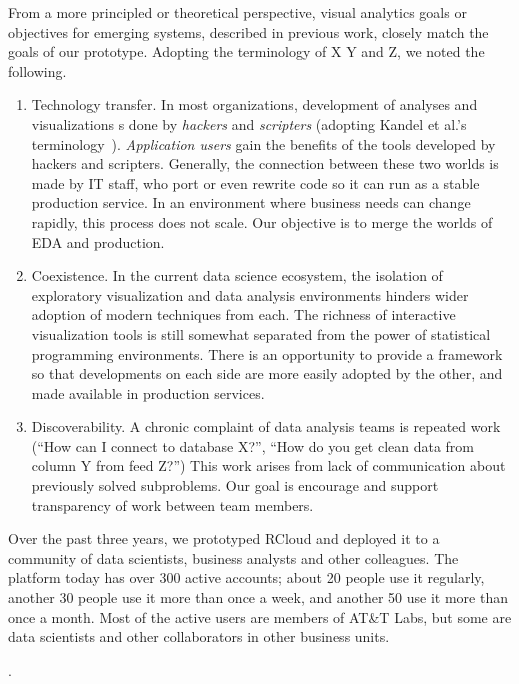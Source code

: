 From a more principled or theoretical perspective, visual analytics goals
or objectives for emerging systems, described in previous work, closely match
the goals of our prototype. Adopting the terminology of X Y and Z, we noted
the following.

\begin{enumerate}

\item Technology transfer.
In most organizations, development of analyses and visualizations 
s done by \emph{hackers} and \emph{scripters} (adopting Kandel et al.'s
terminology~\cite{Kandel:2012:EDA}). \emph{Application users} 
gain the benefits of the tools developed by hackers and scripters.
Generally, the connection between these two worlds is made by IT staff,
who port or even rewrite code so it can run as a stable production service.
In an environment where business needs can change rapidly, this
process does not scale. Our objective is to merge the worlds
of EDA and production.

\item Coexistence. In the current data science ecosystem, the
isolation of exploratory visualization and data analysis
environments hinders wider adoption of modern techniques from each.
The richness of interactive visualization tools is still somewhat
separated from the power of statistical programming environments.
There is an opportunity to provide a framework so that developments
on each side are more easily adopted by the other, and made available
in production services.

\item Discoverability. A chronic complaint of data analysis teams is
repeated work (``How can I connect to database X?'', ``How do you get
clean data from column Y from feed Z?'') This work arises from lack of
communication about previously solved subproblems. Our goal is encourage
and support transparency of work between team members.

\end{enumerate}

Over the past three years, we prototyped RCloud and deployed it to
a community of data scientists, business analysts and other colleagues.  The
platform today has over 300 active accounts; about 20 people use it regularly,
another 30 people use it more than once a week, and another 50 use it more than
once a month.  Most of the
active users are members of AT\&T Labs, but some are data scientists and other
collaborators in other business units.

.
